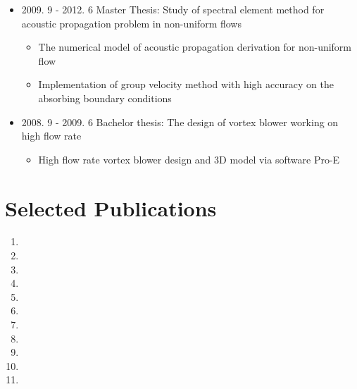 \documentclass[letterpaper]{article}
\begin{document}
\begin{itemize}
\item 2009. 9 - 2012. 6  \hspace{2pt} Master Thesis: Study of spectral element method for acoustic propagation problem in non-uniform flows
		\begin{itemize}
		\item	The numerical model of acoustic propagation derivation for non-uniform flow
		\item	Implementation of group velocity method with high accuracy on the absorbing boundary conditions
		\end{itemize}

\item 2008. 9 - 2009. 6  \hspace{2pt} Bachelor thesis: The design of vortex blower working on high flow rate
		\begin{itemize}
		\item High flow rate vortex blower design and 3D model via software Pro-E
		\end{itemize}
		
\end{itemize}

\vspace{-12pt}
\section*{Selected Publications}
\vspace{-10pt}




\begin{enumerate}
\item {}
\item {}
\item {}
\item {}
\item {}
\item {}
\item {}
\item {}
\item {}
\item {}
\item {}

\end{enumerate}
\end{document}
